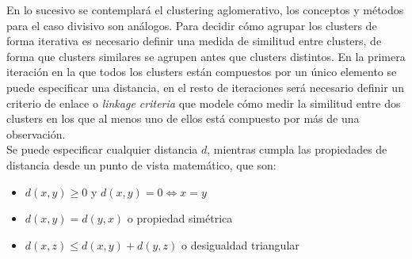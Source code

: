 En lo sucesivo se contemplará el clustering aglomerativo, los conceptos y métodos para el caso divisivo son análogos. Para decidir cómo agrupar los clusters de forma iterativa es necesario definir una medida de similitud entre clusters, de forma que clusters similares se agrupen antes que clusters distintos. En la primera iteración en la que todos los clusters están compuestos por un único elemento se puede especificar una distancia, en el resto de iteraciones será necesario definir un criterio de enlace o \textit{linkage criteria} que modele cómo medir la similitud entre dos clusters en los que al menos uno de ellos está compuesto por más de una observación. \\

Se puede especificar cualquier distancia $d$, mientras cumpla las propiedades de distancia desde un punto de vista matemático, que son:
\begin{itemize}
\item $d(x,y) \geq 0$ y $d(x,y)=0 \iff x=y$
\item $d(x,y) = d(y,x)$ o propiedad simétrica
\item $d(x,z) \leq d(x,y) + d(y,z)$ o desigualdad triangular
\end{itemize}

